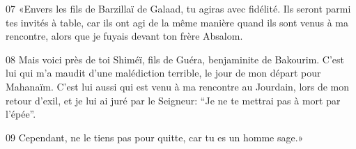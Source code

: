 
07 «Envers les fils de Barzillaï de Galaad, tu agiras avec fidélité. Ils seront parmi tes invités à table, car ils ont agi de la même manière quand ils sont venus à ma rencontre, alors que je fuyais devant ton frère Absalom.

08 Mais voici près de toi Shiméï, fils de Guéra, benjaminite de Bakourim. C’est lui qui m’a maudit d’une malédiction terrible, le jour de mon départ pour Mahanaïm. C’est lui aussi qui est venu à ma rencontre au Jourdain, lors de mon retour d’exil, et je lui ai juré par le Seigneur: “Je ne te mettrai pas à mort par l’épée”.

09 Cependant, ne le tiens pas pour quitte, car tu es un homme sage.»